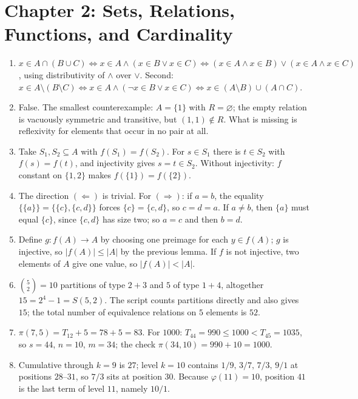 \section*{Chapter 2: Sets, Relations, Functions, and Cardinality}
\begin{enumerate}[label=\textbf{2.\arabic*}]
  \item $x\in A\cap(B\cup C)\iff x\in A\wedge(x\in B\vee x\in C)\iff
        (x\in A\wedge x\in B)\vee(x\in A\wedge x\in C)$, using distributivity of
        $\wedge$ over $\vee$. Second: $x\in A\setminus(B\setminus C)\iff x\in
        A\wedge(\neg x\in B\vee x\in C)\iff x\in(A\setminus B)\cup(A\cap C)$.

  \item False. The smallest counterexample: $A=\{1\}$ with $R=\varnothing$; the empty
        relation is vacuously symmetric and transitive, but $(1,1)\notin R$. What is
        missing is reflexivity for elements that occur in no pair at all.

  \item Take $S_{1},S_{2}\subseteq A$ with $f(S_{1})=f(S_{2})$. For $s\in S_{1}$
        there is $t\in S_{2}$ with $f(s)=f(t)$, and injectivity gives $s=t\in S_{2}$.
        Without injectivity: $f$ constant on $\{1,2\}$ makes $f(\{1\})=f(\{2\})$.

  \item The direction $(\Leftarrow)$ is trivial. For $(\Rightarrow)$: if $a=b$, the
        equality $\{\{a\}\}=\{\{c\},\{c,d\}\}$ forces $\{c\}=\{c,d\}$, so $c=d=a$. If
        $a\ne b$, then $\{a\}$ must equal $\{c\}$, since $\{c,d\}$ has size
        two; so $a=c$ and then $b=d$.

  \item Define $g:f(A)\to A$ by choosing one preimage for each $y\in f(A)$;
        $g$ is injective, so $|f(A)|\le|A|$ by the previous lemma. If $f$ is not
        injective, two elements of $A$ give one value, so $|f(A)|<|A|$.

  \item $\binom{5}{2}=10$ partitions of type $2+3$ and $5$ of type $1+4$, altogether
        $15=2^{4}-1=S(5,2)$. The script counts partitions directly and also
        gives $15$; the total number of equivalence relations on $5$ elements is $52$.

  \item $\pi(7,5)=T_{12}+5=78+5=83$. For $1000$: $T_{44}=990\le 1000<T_{45}=1035$,
        so $s=44$, $n=10$, $m=34$; the check $\pi(34,10)=990+10=1000$.

  \item Cumulative through $k=9$ is $27$; level $k=10$ contains $1/9,\,3/7,\,7/3,\,
        9/1$ at positions $28$--$31$, so $7/3$ sits at position $30$. Because
        $\varphi(11)=10$, position $41$ is the last term of level $11$, namely
        $10/1$.


\end{enumerate}
